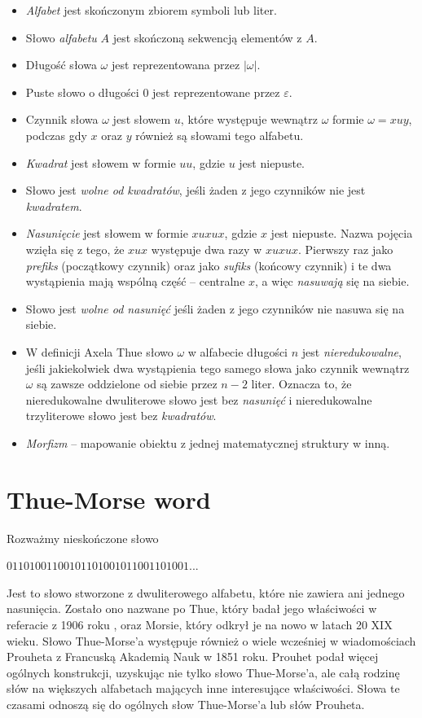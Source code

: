 \documentclass[document]{xmgr}
\begin{document}
\begin{itemize}
\item \emph{Alfabet} jest skończonym zbiorem symboli lub liter.
\item Słowo \emph{alfabetu} $A$ jest skończoną sekwencją elementów z $A$. 
\item Długość słowa $\omega$ jest reprezentowana przez $|\omega|$.
\item Puste słowo o długości $0$ jest reprezentowane przez $\varepsilon$.
\item Czynnik słowa $\omega$ jest słowem $u$, które występuje wewnątrz $\omega$ formie $\omega = xuy$, podczas gdy $x$ oraz $y$ również są słowami tego alfabetu.
\item \emph{Kwadrat} jest słowem w formie $uu$, gdzie $u$ jest niepuste.
\item Słowo jest \emph{wolne od kwadratów}, jeśli żaden z jego czynników nie jest \emph{kwadratem}.
\item \emph{Nasunięcie} jest słowem w formie $xuxux$, gdzie $x$ jest niepuste. Nazwa pojęcia wzięła się z tego, że $xux$ występuje dwa razy w $xuxux$. Pierwszy raz jako \emph{prefiks} (początkowy czynnik) oraz jako \emph{sufiks} (końcowy czynnik) i te dwa wystąpienia mają wspólną część -- centralne $x$, a więc \textit{nasuwają} się na siebie.
\item Słowo jest \emph{wolne od nasunięć} jeśli żaden z jego czynników nie nasuwa się na siebie.
\item W definicji Axela Thue słowo $\omega$ w alfabecie długości $n$ jest \emph{nieredukowalne}, jeśli jakiekolwiek dwa wystąpienia tego samego słowa jako czynnik wewnątrz $\omega$ są zawsze oddzielone od siebie przez $n-2$ liter. Oznacza to, że nieredukowalne dwuliterowe słowo jest bez \emph{nasunięć} i nieredukowalne trzyliterowe słowo jest bez \emph{kwadratów}.
\item \emph{Morfizm} -- mapowanie obiektu z jednej matematycznej struktury w inną.
\end{itemize}



\section{Thue-Morse word}
Rozważmy nieskończone słowo

{\centering $01101001100101101001011001101001 ...$ \par}

Jest to słowo stworzone z dwuliterowego alfabetu, które nie zawiera ani jednego nasunięcia. Zostało ono nazwane po Thue, który badał jego właściwości w referacie z 1906 roku \cite{repetition2}, oraz Morsie, który odkrył je na nowo w latach 20 XIX wieku. Słowo Thue-Morse'a występuje również o wiele wcześniej w wiadomościach  Prouheta \cite{prouhet} z Francuską Akademią Nauk w 1851 roku. Prouhet podał więcej ogólnych konstrukcji, uzyskując nie tylko słowo Thue-Morse'a, ale całą rodzinę słów na większych alfabetach mających inne interesujące właściwości. Słowa te czasami odnoszą się do ogólnych słow Thue-Morse'a lub słów Prouheta.
\end{document}
